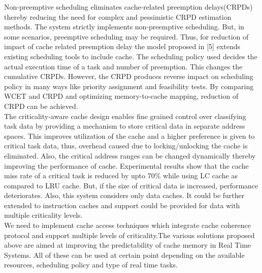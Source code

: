 \documentclass[conference]{IEEEtran}
\begin{document}
    \newline
    Non-preemptive scheduling eliminates cache-related preemption delays(CRPDs) thereby reducing the need for complex and pessimistic CRPD estimation methods. The system strictly implements non-preemptive scheduling. But, in some scenarios, preemptive scheduling may be required. Thus, for reduction of impact of cache related preemption delay the model proposed in [5] extends existing scheduling tools to include cache.  The scheduling policy used decides the actual execution time of a task and number of preemption. This changes the cumulative CRPDs. However, the CRPD produces reverse impact on scheduling policy in many ways like priority assignment and feasibility tests. By comparing WCET and CRPD  and optimizing memory-to-cache mapping, reduction of CRPD can be achieved.\\
    \newline
    The criticality-aware cache design\cite{b4} enables fine grained control over classifying task data by providing a mechanism to store critical data in separate address spaces. This improves utilization of the cache and a higher preference is given to critical task data, thus, overhead caused due to locking/unlocking the cache is eliminated. Also, the critical address ranges can be changed dynamically thereby improving the performance of cache. Experimental results show that the cache miss rate of a critical task is reduced by upto 70\% while using LC cache as compared to LRU cache. But, if the size of critical data is increased, performance deteriorates. Also, this system considers only data caches. It could be further extended to instruction caches and support could be provided for data with multiple criticality levels.\\
    We need to implement cache access techniques which integrate cache coherence protocol and support multiple levels of criticality.The various solutions proposed above are aimed at improving the predictability of cache memory in Real Time Systems. All of these can be used at certain point depending on the available resources, scheduling policy and type of real time tasks.
\end{document}
